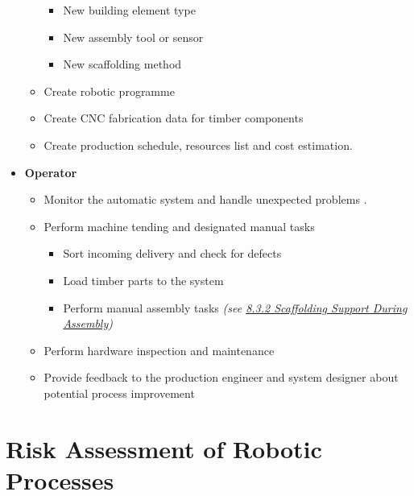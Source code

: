 \begin{itemize}
\begin{itemize}
\begin{itemize}
			\item New building element type

			\item New assembly tool or sensor

			\item New scaffolding method

		\end{itemize}
		\item Create robotic programme 
		\item Create CNC fabrication data for timber components  
		\item Create production schedule, resources list and cost estimation.
	\end{itemize}

	\item \textbf{Operator}

	\begin{itemize}
		\item Monitor the automatic system and handle unexpected problems .

		\item Perform machine tending and designated manual tasks 

		\begin{itemize}
			\item Sort incoming delivery and check for defects 
			\item Load timber parts to the system
			\item Perform manual assembly tasks \textit{(see \ul{8.3.2 Scaffolding Support During Assembly})}
		\end{itemize}

		\item Perform hardware inspection and maintenance

		\item Provide feedback to the production engineer and system designer about potential process improvement

	\end{itemize}
\end{itemize}

\section{Risk Assessment of Robotic Processes}
\label{section:discussion_risk_assessment_of_robotic_processes}

